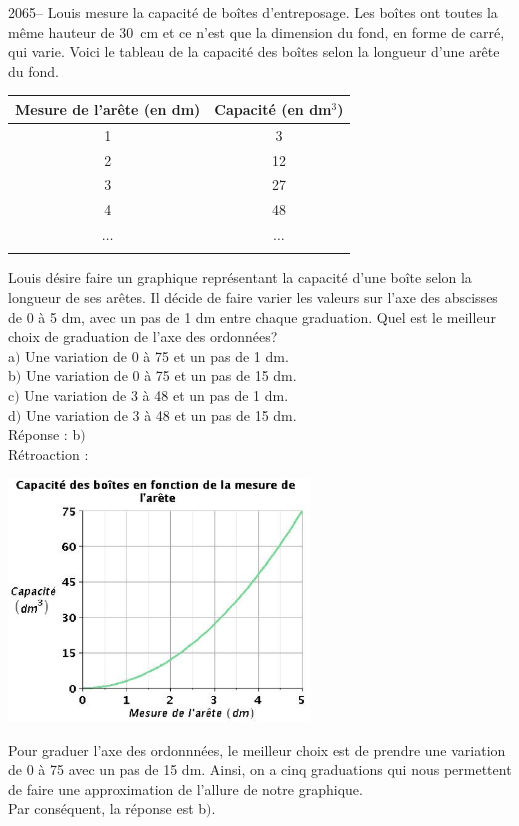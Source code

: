 \documentclass[letterpaper, 12pt]{article}
\begin{document}
2065-- Louis mesure la capacit\'e de bo\^ites d'entreposage. Les bo\^ites ont toutes la m\^eme hauteur de \mbox{30 cm} et ce n'est que la dimension du fond, en forme de carr\'e, qui varie. Voici le tableau de la capacit\'e des bo\^ites selon la longueur d'une ar\^ete du fond.
\begin{center}
 \begin{tabular}{|c|c|} \hline
{\bf Mesure de l'ar\^ete (en dm)} & {\bf Capacit\'e (en dm$^{3}$)}  \\ \hline \hline
1 & 3 \\ \hline
2 & 12 \\ \hline
3 & 27 \\ \hline
4 & 48 \\ \hline
$\ldots$ & $\ldots$ \\ \hline
\multicolumn{2}{c}{}\\
\end{tabular}
\end{center}
Louis d\'esire faire un graphique repr\'esentant la capacit\'e d'une bo\^ite selon la longueur de ses ar\^etes. Il d\'ecide de faire varier les valeurs sur l'axe des abscisses de 0 \`a 5 dm, avec un pas de 1 dm entre chaque graduation. Quel est le meilleur choix de graduation de l'axe des ordonn\'ees?\\

a$)$ Une variation de 0 \`a 75 et un pas de 1 dm. \\
b$)$ Une variation de 0 \`a 75 et un pas de 15 dm. \\
c$)$ Une variation de 3 \`a 48 et un pas de 1 dm. \\
d$)$ Une variation de 3 \`a 48 et un pas de 15 dm. \\

R\'eponse : b$)$\\

R\'etroaction :\\
\begin{center}
 \includegraphics[width=8cm,bb=14 14 509 415]{Q2065.eps}
\end{center}
Pour graduer l'axe des ordonnn\'ees, le meilleur choix est de prendre une variation de 0 \`a 75 avec un pas de 15 dm. Ainsi, on a cinq graduations qui nous permettent de faire une approximation de l'allure de notre graphique.\\
Par cons\'equent, la r\'eponse est b$)$.\\
\end{document}
